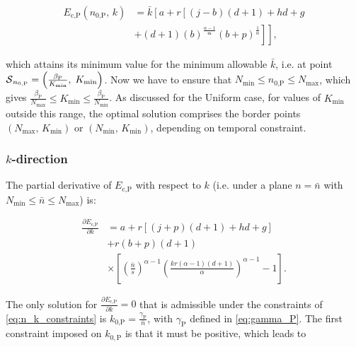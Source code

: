 \documentclass[twocolumn,english]{IEEEtran}
\theoremstyle{plain}
\theoremstyle{definition}
\begin{document}
\begin{align}
E_{\text{c,P}}(n_{\text{0,P}},\, k) & =\bar{k}\left[a+r\left[\left(j-b\right)\left(d+1\right)+hd+g\right.\right.\nonumber \\
 & \left.\left.+\left(d+1\right)\left(b\right)^{\frac{\alpha-1}{\mathbf{\alpha}}}\left(b+p\right)^{\frac{1}{\alpha}}\right]\right],
\end{align}


\noindent which attains its minimum value for the minimum allowable
$\bar{k}$, i.e. at point $\text{\ensuremath{\mathcal{S}}}_{n_{0,\text{P}}}=\left(\frac{\beta_{\text{P}}}{K_{\text{min}}},\; K_{\text{min}}\right)$.
Now we have to ensure that $N_{\text{min}}\le n_{\text{0,P}}\le N_{\text{max}}$,
which gives $\frac{\beta_{\text{P}}}{N_{\text{max}}}\le K_{\text{min}}\le\frac{\beta_{\text{P}}}{N_{\text{min}}}$.
As discussed for the Uniform case, for values of $K_{\text{min}}$
outside this range, the optimal solution comprises the border points
$\left(N_{\text{max}},\, K_{\text{min}}\right)$ or $\left(N_{\text{min}},\, K_{\text{min}}\right)$,
depending on temporal constraint.


\subsubsection{$k$-direction}

The partial derivative of $E_{\text{c,P}}$ with respect to $k$ (i.e.
under a plane $n=\bar{n}$ with $N_{\min}\leq\bar{n}\leq N_{\max}$)
is:

\begin{align}
\frac{\partial E_{\text{c,P}}}{\partial k} & =a+r\left[\left(j+p\right)\left(d+1\right)+hd+g\right]\nonumber \\
 & +r(b+p)(d+1)\\
 & \times\left[\left(\frac{\bar{n}}{s}\right)^{\alpha-1}\left(\frac{kr(\alpha-1)(d+1)}{\alpha}\right)^{\alpha-1}-1\right].\nonumber 
\end{align}


\noindent \begin{flushleft}
The only solution for $\frac{\partial E_{\text{c,P}}}{\partial k}=0$
that is admissible under the constraints of \eqref{eq:n_k_constraints}
is $k_{\text{0,P}}=\frac{\gamma_{\textrm{P}}}{\bar{n}}$, with $\gamma_{\textrm{P}}$
defined in \eqref{eq:gamma_P}. The first constraint imposed on $k_{0,\textrm{P}}$
is that it must be positive, which leads to 
\par\end{flushleft}
\end{document}
